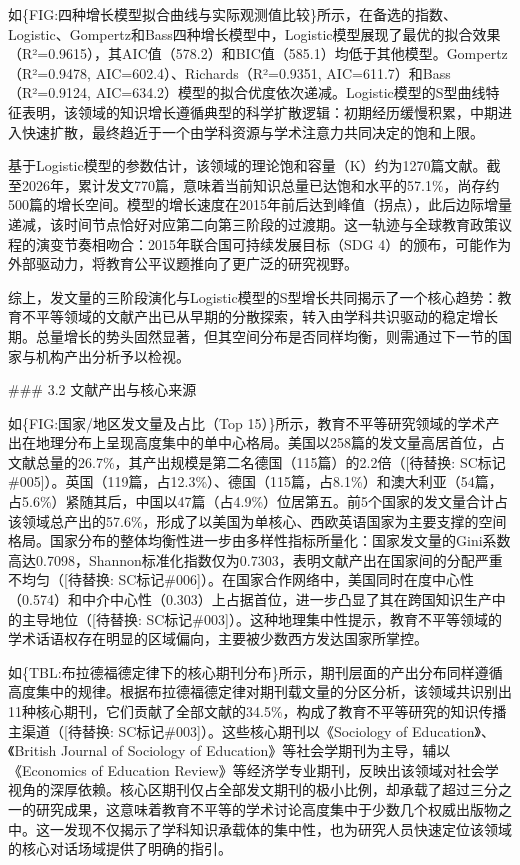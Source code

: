 \documentclass[12pt,a4paper]{article}
\begin{document}
如\{FIG:四种增长模型拟合曲线与实际观测值比较\}所示，在备选的指数、Logistic、Gompertz和Bass四种增长模型中，Logistic模型展现了最优的拟合效果（R²=0.9615），其AIC值（578.2）和BIC值（585.1）均低于其他模型。Gompertz（R²=0.9478, AIC=602.4）、Richards（R²=0.9351, AIC=611.7）和Bass（R²=0.9124, AIC=634.2）模型的拟合优度依次递减。Logistic模型的S型曲线特征表明，该领域的知识增长遵循典型的科学扩散逻辑：初期经历缓慢积累，中期进入快速扩散，最终趋近于一个由学科资源与学术注意力共同决定的饱和上限。

基于Logistic模型的参数估计，该领域的理论饱和容量（K）约为1270篇文献。截至2026年，累计发文770篇，意味着当前知识总量已达饱和水平的57.1\%，尚存约500篇的增长空间。模型的增长速度在2015年前后达到峰值（拐点），此后边际增量递减，该时间节点恰好对应第二向第三阶段的过渡期。这一轨迹与全球教育政策议程的演变节奏相吻合：2015年联合国可持续发展目标（SDG 4）的颁布，可能作为外部驱动力，将教育公平议题推向了更广泛的研究视野。

综上，发文量的三阶段演化与Logistic模型的S型增长共同揭示了一个核心趋势：教育不平等领域的文献产出已从早期的分散探索，转入由学科共识驱动的稳定增长期。总量增长的势头固然显著，但其空间分布是否同样均衡，则需通过下一节的国家与机构产出分析予以检视。

\#\#\# 3.2 文献产出与核心来源

如\{FIG:国家/地区发文量及占比（Top 15）\}所示，教育不平等研究领域的学术产出在地理分布上呈现高度集中的单中心格局。美国以258篇的发文量高居首位，占文献总量的26.7\%，其产出规模是第二名德国（115篇）的2.2倍（[待替换: SC标记\#005]）。英国（119篇，占12.3\%）、德国（115篇，占8.1\%）和澳大利亚（54篇，占5.6\%）紧随其后，中国以47篇（占4.9\%）位居第五。前5个国家的发文量合计占该领域总产出的57.6\%，形成了以美国为单核心、西欧英语国家为主要支撑的空间格局。国家分布的整体均衡性进一步由多样性指标所量化：国家发文量的Gini系数高达0.7098，Shannon标准化指数仅为0.7303，表明文献产出在国家间的分配严重不均匀（[待替换: SC标记\#006]）。在国家合作网络中，美国同时在度中心性（0.574）和中介中心性（0.303）上占据首位，进一步凸显了其在跨国知识生产中的主导地位（[待替换: SC标记\#003]）。这种地理集中性提示，教育不平等领域的学术话语权存在明显的区域偏向，主要被少数西方发达国家所掌控。

如\{TBL:布拉德福德定律下的核心期刊分布\}所示，期刊层面的产出分布同样遵循高度集中的规律。根据布拉德福德定律对期刊载文量的分区分析，该领域共识别出11种核心期刊，它们贡献了全部文献的34.5\%，构成了教育不平等研究的知识传播主渠道（[待替换: SC标记\#003]）。这些核心期刊以《Sociology of Education》、《British Journal of Sociology of Education》等社会学期刊为主导，辅以《Economics of Education Review》等经济学专业期刊，反映出该领域对社会学视角的深厚依赖。核心区期刊仅占全部发文期刊的极小比例，却承载了超过三分之一的研究成果，这意味着教育不平等的学术讨论高度集中于少数几个权威出版物之中。这一发现不仅揭示了学科知识承载体的集中性，也为研究人员快速定位该领域的核心对话场域提供了明确的指引。
\end{document}
